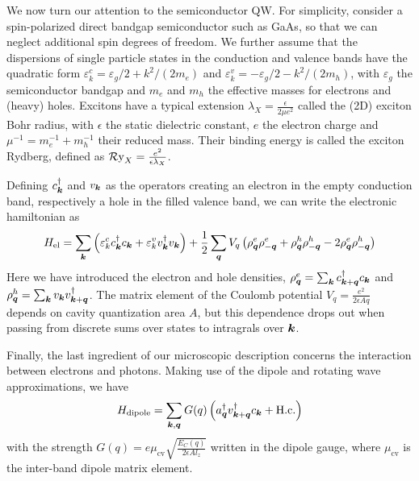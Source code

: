 We now turn our attention to the semiconductor QW. For simplicity,
consider a spin-polarized direct bandgap semiconductor such as GaAs,
so that we can neglect additional spin degrees of freedom. We further
assume that the dispersions of single particle states in the
conduction and valence bands have the quadratic form
$\varepsilon^c_{k} = \varepsilon_g/2 + k^2/(2m_e)$ and
$\varepsilon^v_{k} = - \varepsilon_g/2 - k^2/(2m_h)$, with
$\varepsilon_g$ the semiconductor bandgap and $m_e$ and $m_h$ the
effective masses for electrons and (heavy) holes. Excitons have a
typical extension $\lambda_X = \frac{\epsilon}{2\mu e^2}$ called the
(2D) exciton Bohr radius, with $\epsilon$ the static dielectric
constant, $e$ the electron charge and $\mu^{-1} = m_e^{-1} + m_h^{-1}$
their reduced mass. Their binding energy is called the exciton
Rydberg, defined as $\operatorname{\mathcal{R}y}_X = \frac{e^2}{\epsilon \lambda_X}$.

Defining $c_{\bm{k}}^{\dagger}$ and $v_{\bm{k}}$ as the operators creating
an electron in the empty conduction band, respectively a hole in the
filled valence band, we can write the electronic hamiltonian as
%
\begin{equation}\label{eq:coulomb-hamiltonian}
  H_{\text{el}} = \sum_{\bm{k}} \left( \varepsilon^c_k c_{\bm{k}}^{\dagger} c_{\bm{k}} + \varepsilon^v_k v_{\bm{k}}^{\dagger} v_{\bm{k}} \right) + \frac{1}{2}\sum_{\bm{q}} V_q \left( \rho^e_{\bm{q}} \rho^e_{-\bm{q}} + \rho^h_{\bm{q}} \rho^h_{-\bm{q}} -2 \rho^e_{\bm{q}} \rho^h_{-\bm{q}}\right)
\end{equation}
% 
Here we have introduced the electron and hole densities,
$\rho^e_{\bm{q}} = \sum_{\bm{k}} c_{\bm{k} + \bm{q}}^{\dagger} c_{\bm{k}}$ and
$\rho^h_{\bm{q}} = \sum_{\bm{k}} v_{\bm{k}} v_{\bm{k} + \bm{q}}^{\dagger}$. The
matrix element of the Coulomb potential
$V_q = \frac{e^2}{2 \epsilon A q}$ depends on cavity quantization area
$A$, but this dependence drops out when passing from discrete sums
over states to intragrals over $\bm{k}$.

Finally, the last ingredient of our microscopic description concerns
the interaction between electrons and photons. Making use of the
dipole and rotating wave approximations, we have
%
\begin{equation}\label{eq:dipolar-inter}
  H_{\text{dipole}} = \sum_{\bm{k}, \bm{q}} G(q) \left( a_{\bm{q}}^{\dagger} v_{\bm{k} + \bm{q}}^{\dagger} c_{\bm{k}} + \text{H.c.}\right)
\end{equation}
% 
with the strength
$G(q) = e \mu_{\text{cv}}\sqrt{\frac{E_C(q)}{2\epsilon A l_z}}$
written in the dipole gauge, where $\mu_{\text{cv}}$ is the inter-band
dipole matrix element.

